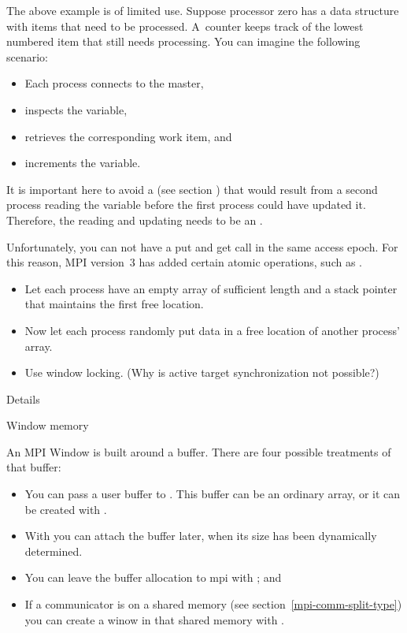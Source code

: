 The above example is of limited use.
Suppose processor zero has a data structure 
with items that need to be processed. A~counter 
keeps track of the lowest numbered item that still needs processing.
You can imagine the following
 scenario:
\begin{itemize}
\item Each process connects to the master,
\item inspects the  variable,
\item retrieves the corresponding work item, and
\item increments the  variable.
\end{itemize}
It is important here to avoid a 
(see section ) that would result
from a second process reading the  variable 
before the first process could have updated it. Therefore, the reading
and updating needs to be an .

Unfortunately, you can not have a put and get call in the same access
epoch. For this reason, MPI version~3 has added certain atomic
operations, such as .

\begin{exercise}
  \label{ex:onesidedbuild}
  \begin{itemize}
  \item
    Let each process have an empty array of sufficient length and a
    stack pointer that maintains the first free location.
  \item
    Now let each process randomly put data in a free location of another
    process' array.
  \item Use window locking. (Why is active target synchronization not possible?)
  \end{itemize}
\end{exercise}

 {Details}

 {Window memory}
\label{sec:mpi-alloc}

An MPI Window is built around a buffer. There are four possible
treatments of that buffer:
\begin{itemize}
\item You can pass a user buffer to
  . This buffer can be an ordinary array,
  or it can be created with .
\item With  you can attach the
  buffer later, when its size has been dynamically determined.
\item You can leave the buffer allocation to mpi with
  ; and
\item If a communicator is on a shared memory (see
  section~\ref{mpi-comm-split-type}) you can create a winow in that
  shared memory with .
\end{itemize}

